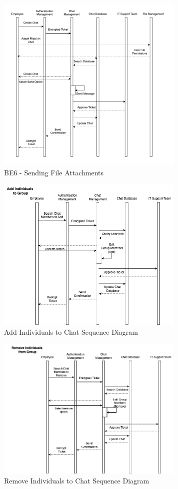 \documentclass[]{article}
\begin{document}
\begin{figure}[H]
    \centering
    \includegraphics[width=9cm]{BE6.png}
    \caption{BE6 - Sending File Attachments}
    \label{fig:galaxy}
\end{figure}

\begin{figure}[H]
	\centering
	\includegraphics[width=0.8\textwidth]{BE7.png}
	\caption{Add Individuals to Chat Sequence Diagram}
\end{figure}

\begin{figure}[H]
	\centering
	\includegraphics[width=0.8\textwidth]{BE8.png}
	\caption{Remove Individuals to Chat Sequence Diagram}
\end{figure}
\end{document}
